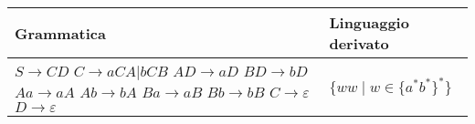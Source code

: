 \documentclass{standalone}
\begin{document}
\begin{tabularx}{\textwidth}{XX}
		Grammatica & Linguaggio derivato \\
    \midrule
        \(S \to CD \) \newline
        \(C \to aCA | bCB \) \newline
        \(AD \to aD \) \newline
        \(BD \to bD \) \newline
        \(Aa \to aA \) \newline
        \(Ab \to bA \) \newline
        \(Ba \to aB \) \newline
        \(Bb \to bB \) \newline
        \(C \to \varepsilon \) \newline
        \(D \to \varepsilon \)
        &
        \(\{ ww \mid w \in \{a^*b^*\}^*\}\)
\end{tabularx}
\end{document}
